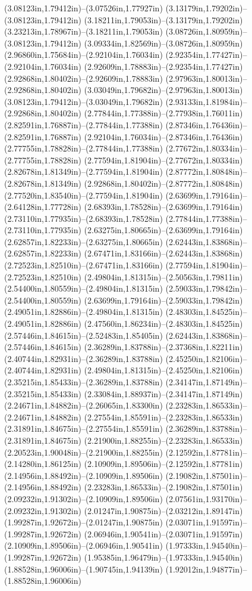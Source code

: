 (3.08123in,1.79412in)--(3.07526in,1.77927in) (3.13179in,1.79202in)--(3.08123in,1.79412in) (3.18211in,1.79053in)--(3.13179in,1.79202in) (3.23213in,1.78967in)--(3.18211in,1.79053in) (3.08726in,1.80959in)--(3.08123in,1.79412in) (3.09334in,1.82569in)--(3.08726in,1.80959in) (2.96860in,1.75684in)--(2.92104in,1.76034in) (2.92354in,1.77427in)--(2.92104in,1.76034in) (2.92609in,1.78883in)--(2.92354in,1.77427in) (2.92868in,1.80402in)--(2.92609in,1.78883in) (2.97963in,1.80013in)--(2.92868in,1.80402in) (3.03049in,1.79682in)--(2.97963in,1.80013in) (3.08123in,1.79412in)--(3.03049in,1.79682in) (2.93133in,1.81984in)--(2.92868in,1.80402in) (2.77844in,1.77388in)--(2.77938in,1.76011in) (2.82591in,1.76887in)--(2.77844in,1.77388in) (2.87346in,1.76436in)--(2.82591in,1.76887in) (2.92104in,1.76034in)--(2.87346in,1.76436in) (2.77755in,1.78828in)--(2.77844in,1.77388in) (2.77672in,1.80334in)--(2.77755in,1.78828in) (2.77594in,1.81904in)--(2.77672in,1.80334in) (2.82678in,1.81349in)--(2.77594in,1.81904in) (2.87772in,1.80848in)--(2.82678in,1.81349in) (2.92868in,1.80402in)--(2.87772in,1.80848in) (2.77520in,1.83540in)--(2.77594in,1.81904in) (2.63699in,1.79164in)--(2.64128in,1.77728in) (2.68393in,1.78528in)--(2.63699in,1.79164in) (2.73110in,1.77935in)--(2.68393in,1.78528in) (2.77844in,1.77388in)--(2.73110in,1.77935in) (2.63275in,1.80665in)--(2.63699in,1.79164in) (2.62857in,1.82233in)--(2.63275in,1.80665in) (2.62443in,1.83868in)--(2.62857in,1.82233in) (2.67471in,1.83166in)--(2.62443in,1.83868in) (2.72523in,1.82510in)--(2.67471in,1.83166in) (2.77594in,1.81904in)--(2.72523in,1.82510in) (2.49804in,1.81315in)--(2.50563in,1.79811in) (2.54400in,1.80559in)--(2.49804in,1.81315in) (2.59033in,1.79842in)--(2.54400in,1.80559in) (2.63699in,1.79164in)--(2.59033in,1.79842in) (2.49051in,1.82886in)--(2.49804in,1.81315in) (2.48303in,1.84525in)--(2.49051in,1.82886in) (2.47560in,1.86234in)--(2.48303in,1.84525in) (2.57446in,1.84615in)--(2.52483in,1.85405in) (2.62443in,1.83868in)--(2.57446in,1.84615in) (2.36289in,1.83788in)--(2.37368in,1.82211in) (2.40744in,1.82931in)--(2.36289in,1.83788in) (2.45250in,1.82106in)--(2.40744in,1.82931in) (2.49804in,1.81315in)--(2.45250in,1.82106in) (2.35215in,1.85433in)--(2.36289in,1.83788in) (2.34147in,1.87149in)--(2.35215in,1.85433in) (2.33084in,1.88937in)--(2.34147in,1.87149in) (2.24671in,1.84882in)--(2.26065in,1.83300in) (2.23283in,1.86533in)--(2.24671in,1.84882in) (2.27554in,1.85591in)--(2.23283in,1.86533in) (2.31891in,1.84675in)--(2.27554in,1.85591in) (2.36289in,1.83788in)--(2.31891in,1.84675in) (2.21900in,1.88255in)--(2.23283in,1.86533in) (2.20523in,1.90048in)--(2.21900in,1.88255in) (2.12592in,1.87781in)--(2.14280in,1.86125in) (2.10909in,1.89506in)--(2.12592in,1.87781in) (2.14956in,1.88492in)--(2.10909in,1.89506in) (2.19082in,1.87501in)--(2.14956in,1.88492in) (2.23283in,1.86533in)--(2.19082in,1.87501in) (2.09232in,1.91302in)--(2.10909in,1.89506in) (2.07561in,1.93170in)--(2.09232in,1.91302in) (2.01247in,1.90875in)--(2.03212in,1.89147in) (1.99287in,1.92672in)--(2.01247in,1.90875in) (2.03071in,1.91597in)--(1.99287in,1.92672in) (2.06946in,1.90541in)--(2.03071in,1.91597in) (2.10909in,1.89506in)--(2.06946in,1.90541in) (1.97333in,1.94540in)--(1.99287in,1.92672in) (1.95385in,1.96479in)--(1.97333in,1.94540in) (1.88528in,1.96006in)--(1.90745in,1.94139in) (1.92012in,1.94877in)--(1.88528in,1.96006in) 